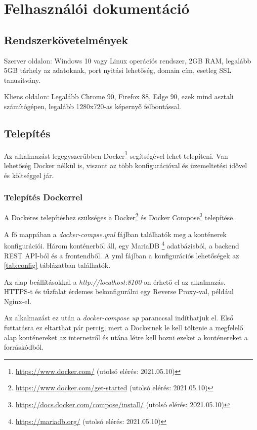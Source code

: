 \chapter{Felhasználói dokumentáció} %
\label{ch:user}

\section{Rendszerkövetelmények}
Szerver oldalon: Windows 10 vagy Linux operációs rendszer, 2GB RAM, legalább 5GB tárhely az adatoknak, port nyitási lehetőség, domain cím, esetleg SSL tanusítvány.

Kliens oldalon: Legalább Chrome 90, Firefox 88, Edge 90, ezek mind asztali számítógépen, legalább 1280x720-as képernyő felbontással.

\section{Telepítés}

Az alkalmazást legegyszerűbben Docker\footnote{\url{https://www.docker.com/} (utolsó elérés: 2021.05.10)} segítségével lehet telepíteni. Van lehetőség Docker nélkül is, viszont az több konfigurációval és üzemeltetési idővel és költséggel jár.

\subsection{Telepítés Dockerrel}

A Dockeres telepítéshez szükséges a Docker\footnote{\url{https://www.docker.com/get-started} (utolsó elérés: 2021.05.10)} és Docker Compose\footnote{\url{https://docs.docker.com/compose/install/} (utolsó elérés: 2021.05.10)} telepítése.

A fő mappában a \textit{docker-compse.yml} fájlban találhatók meg a konténerek konfigurációi. Három konténerből áll, egy MariaDB \footnote{\url{https://mariadb.org/} (utolsó elérés: 2021.05.10)} adatbázisból, a backend REST API-ból és a frontendből.
A yml fájlban a konfigurációs lehetőségek az \ref{tab:config} táblázatban találhatók.

Az alap beállításokkal a \textit{http://localhost:8100}-on érhető el az alkalmazás. HTTPS-t és tűzfalat érdemes bekonfigurálni egy Reverse Proxy\cite{nginxReverseProxy}-val, például Nginx-el.

Az alkalmazást ez után a \textit{docker-compose up} paranccsal indíthatjuk el. Első futtatásra ez eltarthat pár percig, mert a Dockernek le kell töltenie a megfelelő alap konténereket az internetről és utána létre kell hozni ezeket a konténereket a forráskódból.

